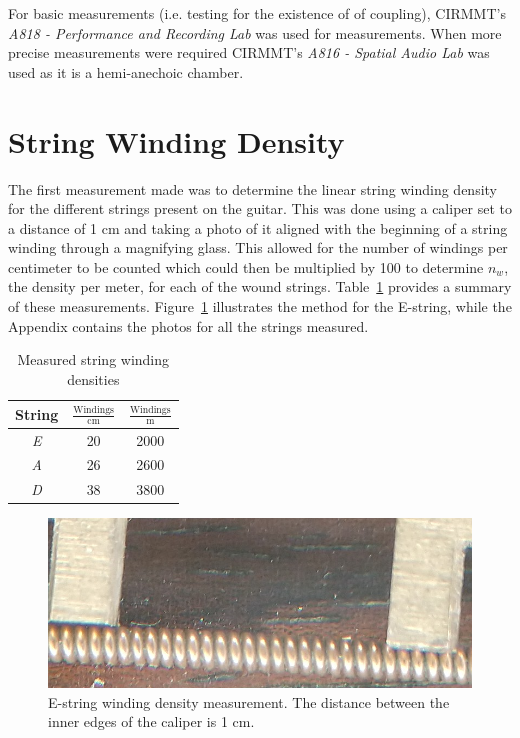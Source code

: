 \documentclass[../main.tex]{subfiles}
\begin{document}
For basic measurements (i.e. testing for the existence of of coupling), CIRMMT's \emph{A818 - Performance and Recording Lab} was used for measurements. When more precise measurements were required CIRMMT's \emph{A816 - Spatial Audio Lab} was used as it is a hemi-anechoic chamber.

\section{String Winding Density}
The first measurement made was to determine the linear string winding density for the different strings present on the guitar. This was done using a caliper set to a distance of 1 cm and taking a photo of it aligned with the beginning of a string winding through a magnifying glass. This allowed for the number of windings per centimeter to be counted which could then be multiplied by 100 to determine $n_w$, the density per meter, for each of the wound strings. Table~\ref{tab:WindingDensities} provides a summary of these measurements. Figure~\ref{fig:EWindings} illustrates the method for the E-string, while the Appendix contains the photos for all the strings measured.

\begin{table}[h]
\centering
    \begin{tabular}{||c|| c| c||} 
        \hline
        String & $\frac{\text{Windings}}{\text{cm}}$ & $\frac{\text{Windings}}{\text{m}}$ \\ [0.5ex] 
        \hline
        \hline
        \emph{E} & 20 & 2000 \\ 
        \hline
        \emph{A} & 26 & 2600 \\
        \hline
        \emph{D} & 38 & 3800 \\ 
        \hline
    \end{tabular}
\caption{Measured string winding densities}
\label{tab:WindingDensities}
\end{table}

\begin{figure}[h]
    \centering
    \includegraphics[scale=.75]{./images/pictures/WindingsEZoom.png}
    \caption{E-string winding density measurement. The distance between the inner edges of the caliper is 1 cm.}
    \label{fig:EWindings}
\end{figure}
\end{document}
